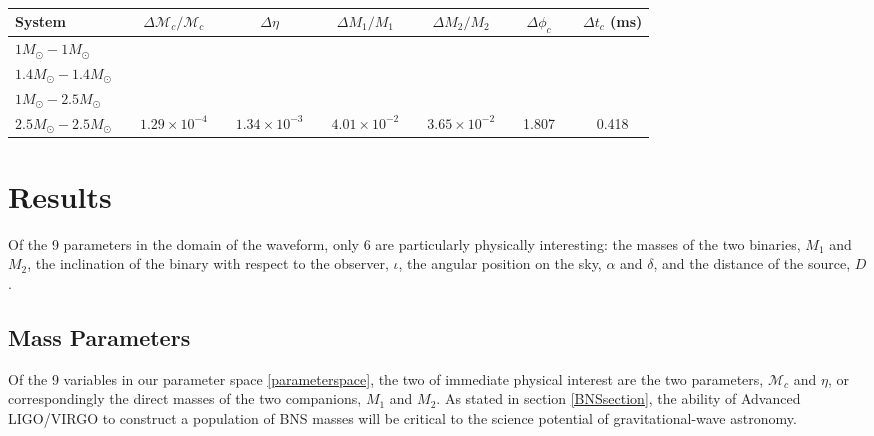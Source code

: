 \documentclass{emulateapj}
\begin{document}
\begin{table}[t!]
\caption{}
\begin{tabular}{lcccccccccccc}


\hline\hline
System & \vline &  $\Delta \mathcal{M}_c / \mathcal{M}_c$ & \vline & $\Delta \eta$ & \vline & $\Delta M_1/ M_1$ & \vline & $\Delta M_2 / M_2$ & \vline & $\Delta \phi_c$ & \vline &  $\Delta t_c$ (ms)\\
\hline\hline
$1M_{\odot}-1M_{\odot}$ & \vline & & \vline & & \vline & & \vline & & \vline & & \vline &\\
\hline
$1.4M_{\odot}-1.4M_{\odot}$ & \vline & & \vline & & \vline & & \vline & & \vline & & \vline &\\
\hline
$1M_{\odot}-2.5M_{\odot}$ & \vline & & \vline & & \vline & & \vline & & \vline & & \vline &\\
\hline
$2.5M_{\odot}-2.5M_{\odot}$ & \vline & $1.29 \times 10^{-4}$ & \vline & $1.34 \times 10^{-3}$ & \vline & $ 4.01 \times 10^{-2}$ & \vline & $3.65\times 10^{-2}$ & \vline & 1.807 & \vline & 0.418 \\
\hline\hline

\end{tabular}
\label{biasedUnbiasedChirpMassErrors}
\end{table}


\section{Results}
\label{resultsSection} 

Of the 9 parameters in the domain of the waveform, only 6 are particularly physically interesting: the masses of the two binaries, $M_1$ and $M_2$, the inclination of the binary with respect to the observer, $\iota$, the angular position on the sky, $\alpha$ and $\delta$, and the distance of the source, $D$.

\subsection{Mass Parameters}

Of the 9 variables in our parameter space \eqref{parameterspace}, the two of immediate physical interest are the two parameters, $\mathcal{M}_c$ and $\eta$, or correspondingly the direct masses of the two companions, $M_1$ and $M_2$.    As stated in section \ref{BNSsection}, the ability of Advanced LIGO/VIRGO to construct a population of BNS masses will be critical to the science potential of gravitational-wave astronomy.  
\end{document}
